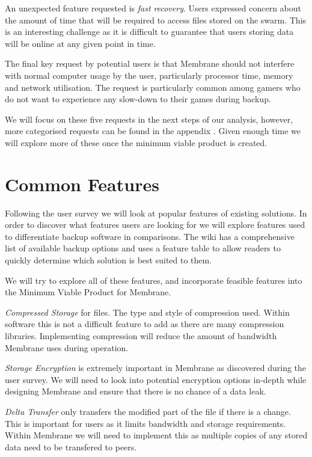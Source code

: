 \documentclass[11pt, a4paper, twocolumn, twoside]{report}
\begin{document}
An unexpected feature requested is \emph{fast recovery}. Users expressed concern about the amount of time that will be required to access files stored on the swarm. This is an interesting challenge as it is difficult to guarantee that users storing data will be online at any given point in time.

The final key request by potential users is that Membrane should not interfere with normal computer usage by the user, particularly processor time, memory and network utilisation. The request is particularly common among gamers who do not want to experience any slow-down to their games during backup.

We will focus on these five requests in the next steps of our analysis, however, more categorised requests can be found in the appendix . Given enough time we will explore more of these once the minimum viable product is created.

\section{Common Features}

Following the user survey we will look at popular features of existing solutions. In order to discover what features users are looking for we will explore features used to differentiate backup software in comparisons. The \cite{arch2017syncandbackup} wiki has a comprehensive list of available backup options and uses a feature table to allow readers to quickly determine which solution is best suited to them.

We will try to explore all of these features, and incorporate feasible features into the Minimum Viable Product for Membrane.

\emph{Compressed Storage} for files. The type and style of compression used. Within software this is not a difficult feature to add as there are many compression libraries. Implementing compression will reduce the amount of bandwidth Membrane uses during operation.

\emph{Storage Encryption} is extremely important in Membrane as discovered during the user survey. We will need to look into potential encryption options in-depth while designing Membrane and ensure that there is no chance of a data leak.

\emph{Delta Transfer} only transfers the modified part of the file if there is a change. This is important for users as it limits bandwidth and storage requirements. Within Membrane we will need to implement this as multiple copies of any stored data need to be transfered to peers.
\end{document}
